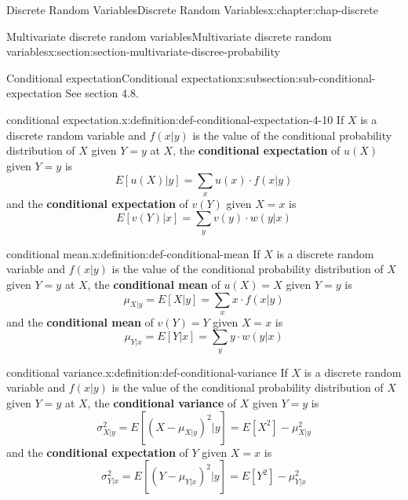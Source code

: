 \documentclass[oneside,10pt,]{book}
\newcommand{\terminology}[1]{\textbf{#1}}
\begin{document}
\begin{chapterptx}{Discrete Random Variables}{}{Discrete Random Variables}{}{}{x:chapter:chap-discrete}
\begin{sectionptx}{Multivariate discrete random variables}{}{Multivariate discrete random variables}{}{}{x:section:section-multivariate-discree-probability}
\begin{subsectionptx}{Conditional expectation}{}{Conditional expectation}{}{}{x:subsection:sub-conditional-expectation}
See section 4.8.%
\begin{definition}{conditional expectation.}{x:definition:def-conditional-expectation-4-10}%
If \(X\) is a discrete random variable and \(\displaystyle f(x|y)\) is the value of the conditional probability distribution of \(X\) given \(\displaystyle Y = y\) at \(X\), the \terminology{conditional expectation} of \(\displaystyle u(X)\) given \(\displaystyle Y = y\) is%
\begin{equation*}
E[u(X)|y] = \sum_x u(x)\cdot f(x|y)
\end{equation*}
and the \terminology{conditional expectation} of \(\displaystyle v(Y)\) given \(\displaystyle X
= x\) is%
\begin{equation*}
E[v(Y)|x] = \sum_y v(y)\cdot w(y|x)
\end{equation*}
%
\end{definition}
\begin{definition}{conditional mean.}{x:definition:def-conditional-mean}%
If \(X\) is a discrete random variable and \(\displaystyle f(x|y)\) is the value of the conditional probability distribution of \(X\) given \(\displaystyle Y = y\) at \(X\), the \terminology{conditional mean} of \(\displaystyle u(X) = X\) given \(\displaystyle Y = y\) is%
\begin{equation*}
\mu_{X|y} = E[X|y] = \sum_x x\cdot f(x|y)
\end{equation*}
and the \terminology{conditional mean} of \(\displaystyle v(Y) = Y\) given \(\displaystyle X = x\) is%
\begin{equation*}
\displaystyle \mu_{Y|x} = E[Y|x] = \sum_y y\cdot w(y|x)
\end{equation*}
%
\end{definition}
\begin{definition}{conditional variance.}{x:definition:def-conditional-variance}%
If \(X\) is a discrete random variable and \(\displaystyle f(x|y)\) is the value of the conditional probability distribution of \(X\) given \(\displaystyle Y = y\) at \(X\), the \terminology{conditional variance} of \(X\) given \(\displaystyle Y = y\) is%
\begin{equation*}
\sigma^2_{X|y} = E[(X-\mu_{X|y})^2|y] = E[X^2]-\mu^2_{X|y}
\end{equation*}
and the \terminology{conditional expectation} of \(Y\) given \(\displaystyle X = x\) is%
\begin{equation*}
\displaystyle\sigma^2_{Y|x} = E[(Y-\mu_{Y|x})^2|y] =
E[Y^2]-\mu^2_{Y|x}
\end{equation*}
%
\end{definition}

\end{subsectionptx}
\end{sectionptx}
\end{chapterptx}
\end{document}
